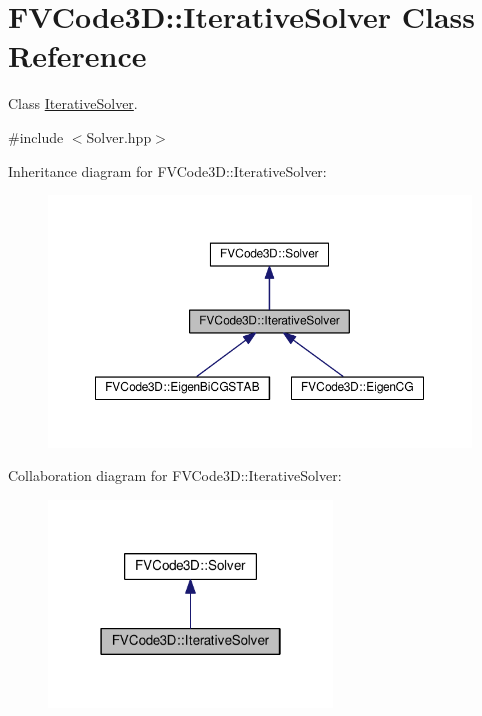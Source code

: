 \hypertarget{classFVCode3D_1_1IterativeSolver}{}\section{F\+V\+Code3D\+:\+:Iterative\+Solver Class Reference}
\label{classFVCode3D_1_1IterativeSolver}


Class \hyperlink{classFVCode3D_1_1IterativeSolver}{Iterative\+Solver}.  




{\ttfamily \#include $<$Solver.\+hpp$>$}



Inheritance diagram for F\+V\+Code3D\+:\+:Iterative\+Solver\+:
\nopagebreak
\begin{figure}[H]
\begin{center}
\leavevmode
\includegraphics[width=350pt]{classFVCode3D_1_1IterativeSolver__inherit__graph}
\end{center}
\end{figure}


Collaboration diagram for F\+V\+Code3D\+:\+:Iterative\+Solver\+:
\nopagebreak
\begin{figure}[H]
\begin{center}
\leavevmode
\includegraphics[width=214pt]{classFVCode3D_1_1IterativeSolver__coll__graph}
\end{center}
\end{figure}
